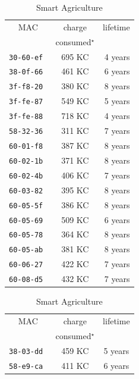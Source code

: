 \documentclass{elsarticle}
\newcommand{\agri}                {Smart Agriculture\xspace}
\begin{document}
\begin{table}
\begin{subtable}{.5\textwidth}
    \begin{tabular}{|c|c|r|}
        \toprule
        MAC           &  charge  & lifetime \\
                      & consumed$^\star$ &          \\
        \midrule
        \tt{30-60-ef} &          695 KC &  4 years \\
        \tt{38-0f-66} &          461 KC &  6 years \\
        \tt{3f-f8-20} &          380 KC &  8 years \\
        \tt{3f-fe-87} &          549 KC &  5 years \\
        \tt{3f-fe-88} &          718 KC &  4 years \\
        \tt{58-32-36} &          311 KC &  7 years \\
        \tt{60-01-f8} &          387 KC &  8 years \\
        \tt{60-02-1b} &          371 KC &  8 years \\
        \tt{60-02-4b} &          406 KC &  7 years \\
        \tt{60-03-82} &          395 KC &  8 years \\
        \tt{60-05-5f} &          386 KC &  8 years \\
        \tt{60-05-69} &          509 KC &  6 years \\
        \tt{60-05-78} &          364 KC &  8 years \\
        \tt{60-05-ab} &          381 KC &  8 years \\
        \tt{60-06-27} &          422 KC &  7 years \\
        \tt{60-08-d5} &          432 KC &  7 years \\
        \bottomrule
    \end{tabular}
    \caption{\agri}
\end{subtable}\hfill
\begin{subtable}{.43\textwidth}
    \begin{tabular}{|c|c|c|}
        \toprule
        MAC           &  charge  & lifetime \\
                      & consumed$^\star$ &          \\
        \midrule
        \tt{38-03-dd} &          459 KC &  5 years \\
        \tt{58-e9-ca} &          411 KC &  6 years \\

\end{tabular}
\end{subtable}
\end{table}
\end{document}
